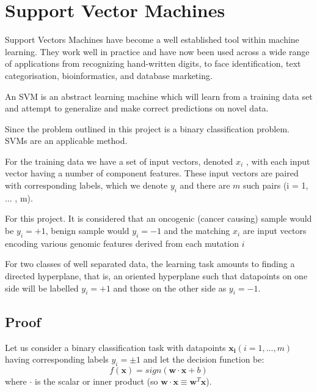 \section{Support Vector Machines}
%

Support Vectors Machines have become a well established tool within machine learning. They work well in practice and have now been used across a wide range of applications from recognizing hand-written digits, to face identification, text categorisation, bioinformatics, and database marketing.

An SVM is an abstract learning machine which will learn from a training data set and attempt to generalize and make correct predictions on novel data.

Since the problem outlined in this project is a binary classification problem. SVMs are an applicable method.

For the training data we have a set of input vectors, denoted \(x_i\) , with each input vector having a number of component features. These input vectors are paired with corresponding labels, which we denote \(y_i\) and there are \(m\) such pairs (i = 1, ... , m).

For this project. It is considered that an oncogenic (cancer causing) sample would be \(y_i=+1\), benign sample would \(y_i=-1\) and the matching \(x_i\) are input vectors encoding various genomic features derived from each mutation \(i\)

For two classes of well separated data, the learning task amounts to finding a directed hyperplane, that is, an oriented hyperplane such that datapoints on one side will be labelled \(y_i = +1\) and those on the other side as \(y_i = −1\).

\subsection{Proof}

Let us consider a binary classification task with datapoints \(\mathbf{x_i} (i = 1, . . . , m)\) having corresponding labels \(y_i = \pm 1\) and let the decision function be:
\begin{equation}
	f (\mathbf{x}) = sign (\mathbf{w} \cdot \mathbf{x} + b)
\end{equation}
where \(\cdot\) is the scalar or inner product (so \(\mathbf{w} \cdot \mathbf{x} \equiv \mathbf{w}^T \mathbf{x}\)).


